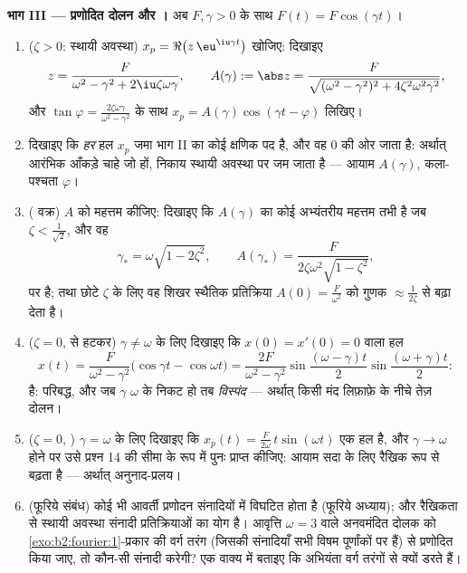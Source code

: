 \begin{problem}
\medskip
\noindent\textbf{भाग III --- प्रणोदित दोलन और ।} अब $F, \gamma > 0$ के साथ $F(t) = F\cos(\gamma t)$।
\begin{enumerate}[resume]
  \item ($\zeta > 0$: स्थायी अवस्था) $x_p =
        \Re\bigl(z\,\eu^{\iu\gamma t}\bigr)$ खोजिए: दिखाइए
        \[
        z = \frac{F}{\omega^2 - \gamma^2 +
        2\iu\zeta\omega\gamma},
        \qquad
        A(\gamma) := \abs z = \frac{F}{\sqrt{(\omega^2 -
        \gamma^2)^2 + 4\zeta^2\omega^2\gamma^2}} ,
        \]
        और $\tan\varphi =
        \frac{2\zeta\omega\gamma}{\omega^2-\gamma^2}$ के साथ $x_p = A(\gamma)\cos(\gamma t - \varphi)$ लिखिए।
  \item दिखाइए कि \emph{हर} हल $x_p$ जमा भाग II का कोई क्षणिक पद है, और वह
        $0$ की ओर जाता है: अर्थात् आरंभिक आँकड़े चाहे जो हों, निकाय
        स्थायी अवस्था पर जम जाता है --- आयाम $A(\gamma)$, कला-पश्चता $\varphi$।
  \item ( वक्र) $A$ को महत्तम कीजिए: दिखाइए कि $A(\gamma)$ का कोई
        अभ्यंतरीय महत्तम तभी है जब $\zeta <
        \frac{1}{\sqrt2}$, और वह
        \[
        \gamma_* = \omega\sqrt{1 - 2\zeta^2},
        \qquad
        A(\gamma_*) =
        \frac{F}{2\zeta\omega^2\sqrt{1-\zeta^2}} ,
        \]
        पर है; तथा छोटे $\zeta$ के लिए वह शिखर स्थैतिक प्रतिक्रिया $A(0) = \frac F{\omega^2}$ को
        गुणक $\approx \frac{1}{2\zeta}$ से बढ़ा देता है।
  \item ($\zeta = 0$,  से हटकर) $\gamma \neq \omega$ के लिए दिखाइए कि $x(0) = x'(0) = 0$ वाला हल
        \[
        x(t) = \frac{F}{\omega^2 -
        \gamma^2}\bigl(\cos\gamma t - \cos\omega t\bigr)
        = \frac{2F}{\omega^2-\gamma^2}
        \sin\frac{(\omega-\gamma)t}{2}
        \sin\frac{(\omega+\gamma)t}{2} :
        \]
        है: परिबद्ध, और जब $\gamma$ $\omega$ के निकट हो तब \emph{विस्पंद} ---
        अर्थात् किसी मंद लिफ़ाफ़े के नीचे तेज़ दोलन।
  \item ($\zeta = 0$, ) $\gamma = \omega$ के लिए दिखाइए कि $x_p(t) = \frac{F}{2\omega}\,t\sin(\omega t)$ एक हल है, और $\gamma \to \omega$ होने
        पर उसे प्रश्न 14 की सीमा के रूप में पुनः प्राप्त कीजिए: आयाम सदा
        के लिए रैखिक रूप से बढ़ता है --- अर्थात् अनुनाद-प्रलय।
  \item (फूरिये संबंध) कोई भी आवर्ती प्रणोदन संनादियों में विघटित होता है
        (फूरिये अध्याय); और रैखिकता से स्थायी अवस्था संनादी प्रतिक्रियाओं
        का योग है। आवृत्ति $\omega = 3$ वाले अनवमंदित दोलक को \cref{exo:b2:fourier:1}-प्रकार की वर्ग
        तरंग (जिसकी संनादियाँ सभी विषम पूर्णांकों पर हैं) से प्रणोदित
        किया जाए, तो कौन-सी संनादी  करेगी? एक वाक्य में बताइए कि
        अभियंता वर्ग तरंगों से क्यों डरते हैं।
\end{enumerate}


\end{problem}
